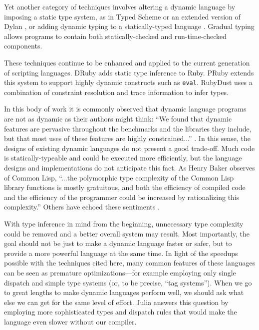 \documentclass[9pt]{sigplanconf}
\begin{document}
Yet another category of techniques involves altering a dynamic language
by imposing a static type system, as in Typed Scheme \cite{typedscheme}
or an extended version of Dylan \cite{dylantypes}, or adding dynamic typing
to a statically-typed
language \cite{dyntype}. Gradual typing \cite{gradualobjects} allows programs
to contain both statically-checked and run-time-checked components.

These techniques continue to be enhanced and applied to the current
generation of scripting languages. DRuby \cite{druby} adds static
type inference to Ruby. PRuby \cite{profileguided} extends this system to
support highly dynamic constructs such as \texttt{eval}. RubyDust
\cite{rubydust} uses a combination of constraint resolution and trace
information to infer types.

In this body of work it is commonly observed that dynamic language programs
are not as dynamic as their authors might think: ``We found that dynamic
features are pervasive throughout the benchmarks and the libraries they
include, but that most uses of these features are highly constrained...''
\cite{profileguided}. In this sense, the designs of existing dynamic languages
do not present a good trade-off. Much code is statically-typeable and could be
executed more efficiently, but the language designs and implementations do not
anticipate this fact. As Henry Baker observes of Common Lisp, ``...the
polymorphic type complexity of the Common Lisp library functions is mostly
gratuitous, and both the efficiency of compiled code and the efficiency of the
programmer could be increased by rationalizing this complexity.''\cite{nimble}
Others have echoed these sentiments \cite{lispcrit}.

With type inference in mind from the beginning, unnecessary type complexity
could be removed and a better overall system may result.
Most importantly, the goal should not be just to make a dynamic language
faster or safer, but to provide a more powerful language at the same time.
In light of the speedups possible with the techniques cited here, many common
features of these languages can be seen as premature optimizations---for
example employing only single dispatch and simple type systems (or, to be
precise, ``tag systems''). When we go to great lengths to make dynamic
languages perform well, we should ask what else we can get for the same
level of effort. Julia answers this question by employing more
sophisticated types and dispatch rules that would make the language even
slower without our compiler.
\end{document}

